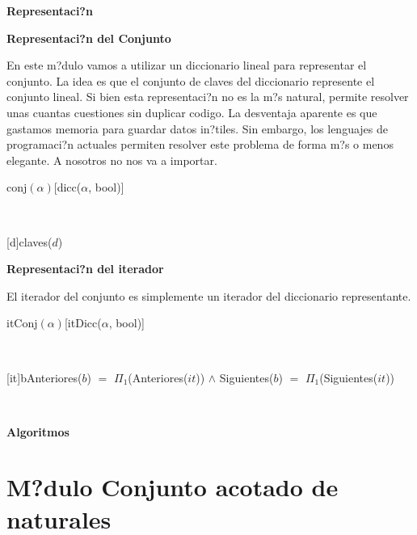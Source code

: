 \documentclass[a4paper,10pt]{article}
\newenvironment{Representacion}{%
  \vspace*{2ex}%
  \noindent\textbf{\Large Representaci?n}%
  \vspace*{2ex}%
}{}
\newenvironment{Algoritmos}{%
  \vspace*{2ex}%
  \noindent\textbf{\Large Algoritmos}%
  \vspace*{2ex}%
}{}
\newcommand{\Titulo}[1]{
  \vspace*{1ex}\par\noindent\textbf{\large #1}\par
}
\begin{document}
\begin{Representacion}
  
  \Titulo{Representaci?n del Conjunto}

  En este m?dulo vamos a utilizar un diccionario lineal para representar el conjunto.  La idea es que el conjunto de claves del diccionario represente el conjunto lineal.  Si bien esta representaci?n no es la m?s natural, permite resolver unas cuantas cuestiones sin duplicar codigo.  La desventaja aparente es que gastamos memoria para guardar datos in?tiles.  Sin embargo, los lenguajes de programaci?n actuales permiten resolver este problema de forma m?s o menos elegante.  A nosotros no nos va a importar.

  \begin{Estructura}{conj$(\alpha)$}[dicc($\alpha$, bool)]
  \end{Estructura}


  ~

  [d]{claves($d$)}

  \Titulo{Representaci?n del iterador}

  El iterador del conjunto es simplemente un iterador del diccionario representante.

  \begin{Estructura}{itConj$(\alpha)$}[itDicc($\alpha$, bool)]
  \end{Estructura}


  ~

  [it]{b}{Anteriores($b$) $=$ $\Pi_1$(Anteriores($it$)) $\land$ Siguientes($b$) $=$ $\Pi_1$(Siguientes($it$))}\mbox{}

  ~


\end{Representacion}

\begin{Algoritmos}
  
\end{Algoritmos}



\section{M?dulo Conjunto acotado de naturales}
\end{document}

